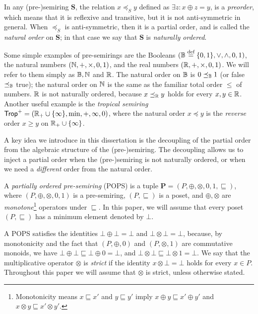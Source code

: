 In any (pre-)semiring $\bm S$, the relation $x \preceq_S y$ defined as
$\exists z: x \oplus z = y$, is a {\em preorder}, which means that it
is reflexive and transitive, but it is not anti-symmetric in general.
When $\preceq_S$ is anti-symmetric, then it is a partial order, and is
called the {\em natural order} on $\bm S$; in that case we say that
$\bm S$ is {\em naturally ordered}.

\begin{ex}
  Some simple examples of pre-semirings are the Booleans
  $(\mathbb B \stackrel{\text{def}}{=} \{0,1\}, \vee, \wedge, 0, 1)$, the natural numbers
  $(\mathbb N, +, \times , 0, 1)$, and the real numbers
  $(\mathbb R, +, \times, 0, 1)$.  We will refer to them simply as $\mathbb B, \mathbb N$
  and $\mathbb R$.  The natural order on $\mathbb B$ is $0 \preceq_\mathbb B 1$ (or {\sf
    false} $\preceq_\mathbb B$ {\sf true}); the natural order on $\mathbb N$ is the
  same as the familiar total order $\leq$ of numbers.  $\mathbb R$ is not
  naturally ordered, because $x \preceq_\mathbb R y$ holds for every
  $x,y \in \mathbb R$.  Another useful example is the {\em tropical semiring}
  $\text{\sf Trop}^+ = (\mathbb R_+ \cup \{\infty\}, \min,+, \infty, 0)$, where the
  natural order $x \preceq y$ is the {\em reverse} order $x \geq y$ on
  $\mathbb R_+ \cup \{\infty\}$.
\end{ex}


A key idea we introduce in this dissertation is the decoupling of the partial order from the
algebraic structure of the (pre-)semiring.
The decoupling allows us to inject a partial order when the (pre-)semiring is not
naturally ordered, or when we need a {\em different} order from the natural order.

\begin{defn}[POPS] \label{def:pops} A {\em partially ordered pre-semiring} (POPS) is a tuple
  $\bm P = (P, \oplus, \otimes, 0, 1, \sqsubseteq)$, where
  $(P, \oplus, \otimes, 0, 1)$ is a pre-semiring, $(P, \sqsubseteq)$
  is a poset, and $\oplus, \otimes$ are {\em monotone}\footnote{Monotonicity means
  $x\sqsubseteq x'$ and $y \sqsubseteq y'$ imply $x\oplus y \sqsubseteq x' \oplus y'$
  and $x \otimes y \sqsubseteq x' \otimes y'$.}
  operators under $\sqsubseteq$.
  In this paper, we will assume that every poset $(P, \sqsubseteq)$ has a minimum
  element denoted by $\bot$.
\end{defn}

A POPS satisfies the identities $\bot \oplus \bot = \bot$ and
$\bot \otimes \bot = \bot$, because, by monotonicity and the fact that
$(P,\oplus,0)$ and $(P,\otimes,1)$ are commutative monoids, we have
$\bot \oplus \bot \sqsubseteq \bot \oplus 0 = \bot$, and
$\bot \otimes \bot \sqsubseteq \bot \otimes 1 = \bot$.  We say that
the multiplicative operator $\otimes$ is {\em strict} if the identity
$x \otimes \bot = \bot$ holds for every $x \in P$.
Throughout this paper we will assume that $\otimes$ is strict,
unless otherwise stated.


